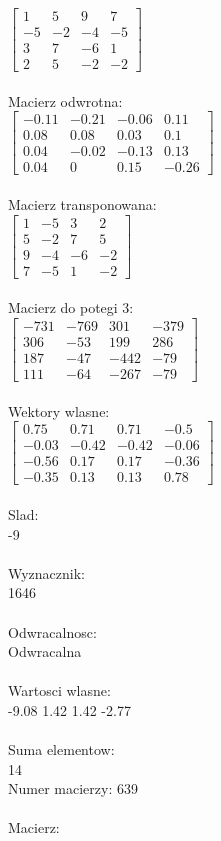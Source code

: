\documentclass[a4paper,12pt]{article}
\begin{document}
$\begin{bmatrix} 1&5&9&7\\-5&-2&-4&-5\\3&7&-6&1\\2&5&-2&-2 \end{bmatrix}$
\\
\\
Macierz odwrotna:\\

$\begin{bmatrix} -0.11&-0.21&-0.06&0.11\\0.08&0.08&0.03&0.1\\0.04&-0.02&-0.13&0.13\\0.04&0&0.15&-0.26 \end{bmatrix}$
\\
\\
Macierz transponowana:\\

$\begin{bmatrix} 1&-5&3&2\\5&-2&7&5\\9&-4&-6&-2\\7&-5&1&-2 \end{bmatrix}$
\\
\\
Macierz do potegi 3:\\

$\begin{bmatrix} -731&-769&301&-379\\306&-53&199&286\\187&-47&-442&-79\\111&-64&-267&-79 \end{bmatrix}$
\\
\\
Wektory wlasne:\\

$\begin{bmatrix} 0.75&0.71&0.71&-0.5\\-0.03&-0.42&-0.42&-0.06\\-0.56&0.17&0.17&-0.36\\-0.35&0.13&0.13&0.78 \end{bmatrix}$
\\
\\
Slad:\\
-9
\\
\\
Wyznacznik:\\
1646
\\
\\
Odwracalnosc:\\
Odwracalna
\\
\\
Wartosci wlasne:\\
-9.08 1.42 1.42 -2.77
\\
\\
Suma elementow:\\
14
\\
\newpage
Numer macierzy:
639
\\
\\
Macierz:\\
\end{document}
